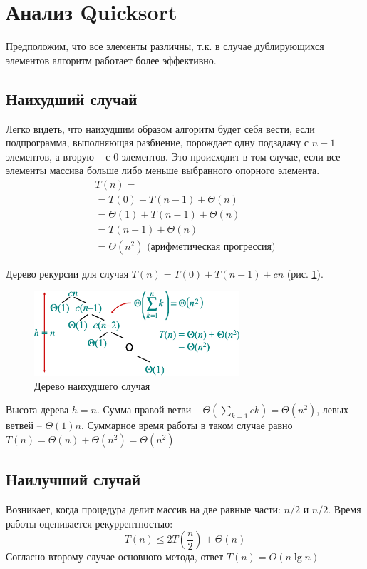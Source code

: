 \documentclass[11pt]{article}
\begin{document}
\section{Анализ Quicksort}

Предположим, что все элементы различны, т.к. в случае дублирующихся элементов алгоритм работает более эффективно.

\subsection{Наихудший случай}

Легко видеть, что наихудшим образом алгоритм будет себя вести, если подпрограмма, выполняющая разбиение, порождает одну подзадачу с $n-1$ элементов, а вторую -- с $0$ элементов. Это происходит в том случае, если все элементы массива больше либо меньше выбранного опорного элемента.
\begin{align*}
  T(n) = \\
    = T(0) + T(n-1) + \Theta(n) \\ 
    = \Theta(1) + T(n-1) + \Theta(n) \\
    = T(n-1) + \Theta(n) \\
    = \Theta(n^2) \text{ (арифметическая прогрессия)}
\end{align*}

Дерево рекурсии для случая $T(n) = T(0) + T(n-1) + cn$ (рис. \ref{fig:tree1}). 
\begin{figure}[ht]
  \centering
  \includegraphics[width=3in]{lecture4/tree1.eps}
  \caption{Дерево наихудшего случая}
  \label{fig:tree1}
\end{figure}

Высота дерева $h = n$. Сумма правой ветви -- $\Theta(\sum_{k=1}ck) = \Theta(n^2)$, левых ветвей -- ${\Theta(1)}n$. Суммарное время работы в таком случае равно $T(n) = \Theta(n) + \Theta(n^2) = \Theta(n^2)$

\subsection{Наилучший случай}

Возникает, когда процедура делит массив на две равные части: $n/2$ и $n/2$. Время работы оценивается рекуррентностью:
\begin{equation*}
T(n) \leqslant 2T(\frac{n}{2}) + \Theta(n)
\end{equation*}
Согласно второму случае основного метода, ответ $T(n) = O(n \lg n)$
\end{document}
